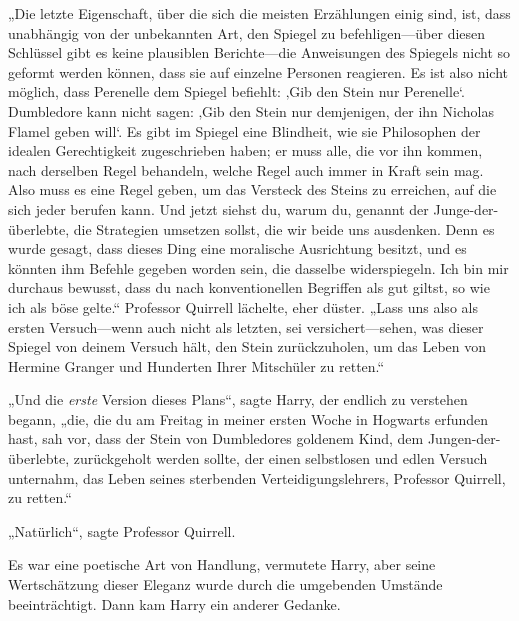 „Die letzte Eigenschaft, über die sich die meisten Erzählungen einig sind, ist, dass unabhängig von der unbekannten Art, den Spiegel zu befehligen—über diesen Schlüssel gibt es keine plausiblen Berichte—die Anweisungen des Spiegels nicht so geformt werden können, dass sie auf einzelne Personen reagieren. Es ist also nicht möglich, dass Perenelle dem Spiegel befiehlt: ‚Gib den Stein nur Perenelle‘. Dumbledore kann nicht sagen: ‚Gib den Stein nur demjenigen, der ihn Nicholas Flamel geben will‘. Es gibt im Spiegel eine Blindheit, wie sie Philosophen der idealen Gerechtigkeit zugeschrieben haben; er muss alle, die vor ihn kommen, nach derselben Regel behandeln, welche Regel auch immer in Kraft sein mag. Also muss es eine Regel geben, um das Versteck des Steins zu erreichen, auf die sich jeder berufen kann. Und jetzt siehst du, warum du, genannt der Junge-der-überlebte, die Strategien umsetzen sollst, die wir beide uns ausdenken. Denn es wurde gesagt, dass dieses Ding eine moralische Ausrichtung besitzt, und es könnten ihm Befehle gegeben worden sein, die dasselbe widerspiegeln. Ich bin mir durchaus bewusst, dass du nach konventionellen Begriffen als gut giltst, so wie ich als böse gelte.“ Professor Quirrell lächelte, eher düster. „Lass uns also als ersten Versuch—wenn auch nicht als letzten, sei versichert—sehen, was dieser Spiegel von deinem Versuch hält, den Stein zurückzuholen, um das Leben von Hermine Granger und Hunderten Ihrer Mitschüler zu retten.“

„Und die \emph{erste} Version dieses Plans“, sagte Harry, der endlich zu verstehen begann, „die, die du am Freitag in meiner ersten Woche in Hogwarts erfunden hast, sah vor, dass der Stein von Dumbledores goldenem Kind, dem Jungen-der-überlebte, zurückgeholt werden sollte, der einen selbstlosen und edlen Versuch unternahm, das Leben seines sterbenden Verteidigungslehrers, Professor Quirrell, zu retten.“

„Natürlich“, sagte Professor Quirrell.

Es war eine poetische Art von Handlung, vermutete Harry, aber seine Wertschätzung dieser Eleganz wurde durch die umgebenden Umstände beeinträchtigt.
Dann kam Harry ein anderer Gedanke.

